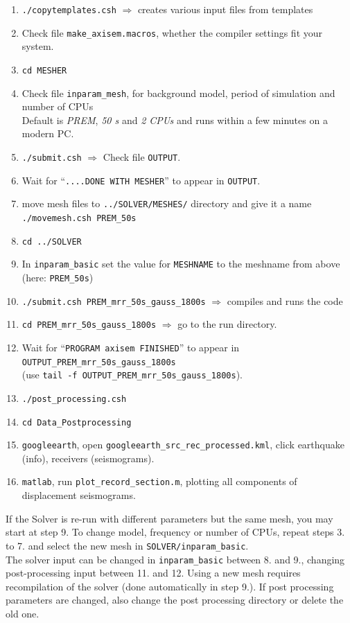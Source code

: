\documentclass{article}
\begin{document}
\begin{enumerate}
    \item \verb|./copytemplates.csh| $\Rightarrow$ creates various input files from templates
    \item Check file \verb|make_axisem.macros|, whether the compiler settings fit your
          system.
    \item \verb|cd MESHER| 
    \item Check file {\tt inparam\_mesh}, for background model, period of simulation and
          number of CPUs \\
          Default is \textit{PREM}, \textit{50 s} and \textit{2 CPUs} and runs within a
          few minutes on a modern PC.
    \item \verb|./submit.csh| $\Rightarrow$ Check file {\tt OUTPUT}.
    \item Wait for ``{\tt ....DONE WITH MESHER}'' to appear in {\tt OUTPUT}.
    \item move mesh files to \verb|../SOLVER/MESHES/| directory and give it a name
          \verb|./movemesh.csh PREM_50s| 
    \item \verb|cd ../SOLVER|
    \item In \verb|inparam_basic| set the value for \verb|MESHNAME| to the meshname from
          above (here: \verb|PREM_50s|)
    \item \verb|./submit.csh PREM_mrr_50s_gauss_1800s|  $\Rightarrow$ compiles and runs
          the code
    \item \verb|cd PREM_mrr_50s_gauss_1800s| $\Rightarrow$ go to the run directory.
    \item Wait for ``\verb|PROGRAM axisem FINISHED|'' to appear in
          \verb|OUTPUT_PREM_mrr_50s_gauss_1800s| \\
          (use \verb|tail -f OUTPUT_PREM_mrr_50s_gauss_1800s|).
    \item \verb|./post_processing.csh|
    \item \verb|cd Data_Postprocessing| 
    \item \verb|googleearth|, open {\tt googleearth\_src\_rec\_processed.kml}, click
            earthquake (info), receivers (seismograms).
    \item {\tt matlab}, run {\tt plot\_record\_section.m}, plotting all components
            of displacement seismograms.

\end{enumerate}
If the Solver is re-run with different parameters but the same mesh, you may start at step 9. 
To change model, frequency or number of CPUs, repeat steps 3. to 7. and select the new
mesh in \verb|SOLVER/inparam_basic|. \\
The solver input can be changed in \verb|inparam_basic| between 8. and 9.,
changing post-processing input between 11. and 12. Using a new mesh requires
recompilation of the solver (done automatically in step 9.). If post
processing parameters are changed, also change the post processing directory or
delete the old one.
\end{document}
